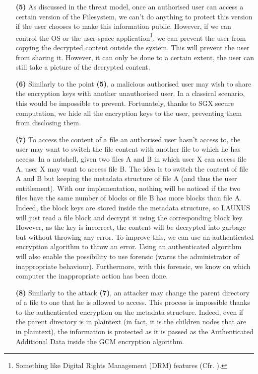\documentclass[../main.tex]{subfiles}
\begin{document}
\begin{itemize}
    \item[\textbf{(5)}] As discussed in the threat model, once an authorised user can access a certain version of the Filesystem, we can't do anything to protect this version if the user chooses to make this information public. However, if we can control the OS or the user-space application\footnote{Something like Digital Rights Management (DRM) features (Cfr. \cite{wiki:drm}).}, we can prevent the user from copying the decrypted content outside the system. This will prevent the user from sharing it. However, it can only be done to a certain extent, the user can still take a picture of the decrypted content.
    \item[\textbf{(6)}] Similarly to the point \textbf{(5)}, a malicious authorised user may wish to share the encryption keys with another unauthorised user. In a classical scenario, this would be impossible to prevent. Fortunately, thanks to SGX secure computation, we hide all the encryption keys to the user, preventing them from disclosing them.
    \item[\textbf{(7)}] To access the content of a file an authorised user hasn't access to, the user may want to switch the file content with another file to which he has access. In a nutshell, given two files A and B in which user X can access file A, user X may want to access file B. The idea is to switch the content of file A and B but keeping the metadata structure of file A (and thus the user entitlement). With our implementation, nothing will be noticed if the two files have the same number of blocks or file B has more blocks than file A. Indeed, the block keys are stored inside the metadata structure, so LAUXUS will just read a file block and decrypt it using the corresponding block key. However, as the key is incorrect, the content will be decrypted into garbage but without throwing any error. To improve this, we can use an authenticated encryption algorithm to throw an error. Using an authenticated algorithm will also enable the possibility to use forensic (warns the administrator of inappropriate behaviour). Furthermore, with this forensic, we know on which computer the inappropriate action has been done.
    \item[\textbf{(8)}] Similarly to the attack \textbf{(7)}, an attacker may change the parent directory of a file to one that he is allowed to access. This process is impossible thanks to the authenticated encryption on the metadata structure. Indeed, even if the parent directory is in plaintext (in fact, it is the children nodes that are in plaintext), the information is protected as it is passed as the Authenticated Additional Data inside the GCM encryption algorithm.

\end{itemize}
\end{document}
